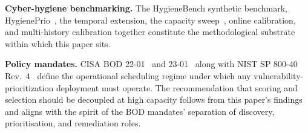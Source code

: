 \textbf{Cyber-hygiene benchmarking.} The HygieneBench synthetic benchmark,
HygienePrio~\cite{paper4hygieneprio}, the temporal extension,
the capacity sweep~\cite{paper6capacity}, online calibration,
and multi-history calibration together constitute
the methodological substrate within which this paper sits.

\textbf{Policy mandates.}
CISA BOD 22-01~\cite{cisa2021bod2201} and 23-01~\cite{cisa2022bod2301}
along with NIST SP 800-40 Rev.~4~\cite{nist2022sp80040r4} define the
operational scheduling regime under which any vulnerability-prioritization
deployment must operate. The recommendation that scoring and selection
should be decoupled at high capacity follows from this paper's
findings and aligns with the spirit of the BOD mandates' separation of
discovery, prioritisation, and remediation roles.
